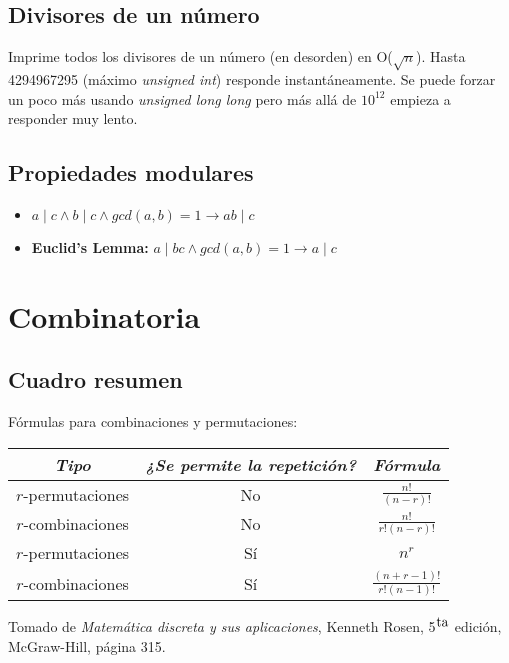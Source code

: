 \documentclass[10pt,letterpaper,twocolumn]{article}
\newcommand{\codigofuente}[1]{

\dotfill
}
\begin{document}
\subsection{Divisores de un número}
Imprime todos los divisores de un número (en desorden) en O($\sqrt{n}$).
Hasta 4294967295 (máximo \textit{unsigned int}) responde instantáneamente. Se puede
forzar un poco más usando \textit{unsigned long long} pero más allá de $10^{12}$ empieza a
responder muy lento.
\codigofuente{./src/teoria_de_numeros/divisores.cpp}

\subsection{Propiedades modulares}

\begin{itemize}
  \item $ a \mid c \land b \mid c \land gcd(a, b) = 1 \rightarrow ab \mid c $
  \item \textbf{Euclid's Lemma:}  $ a \mid bc \land gcd(a, b) = 1 \rightarrow a \mid c $
\end{itemize}

\section{Combinatoria}
\subsection{Cuadro resumen}
Fórmulas para combinaciones y permutaciones:
\begin{center}
  \renewcommand{\arraystretch}{2} %
  \begin{tabular}{| c | c | c |}
    \hline
    \textit{Tipo} & \textit{¿Se permite la repetición?} & \textit{Fórmula} \\ [1.5ex]
    \hline\hline

    $r$-permutaciones & No & $ \displaystyle\frac{n!}{(n-r)!} $ \\ [1.5ex]
    \hline
    $r$-combinaciones & No & $ \displaystyle\frac{n!}{r!(n-r)!} $ \\  [1.5ex]
    \hline
    $r$-permutaciones & Sí & $ \displaystyle n^{r} $ \\
    \hline
    $r$-combinaciones & Sí & $ \displaystyle\frac{(n+r-1)!}{r!(n-1)!} $ \\ [1.5ex]
    \hline
  \end{tabular}
  \renewcommand{\arraystretch}{1}
\end{center}
Tomado de \textit{Matemática discreta y sus aplicaciones}, Kenneth Rosen, 5${}^{\hbox{ta}}$ edición, McGraw-Hill, página 315.
\end{document}
